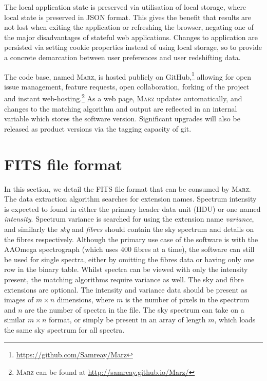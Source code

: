 \documentclass[5p]{elsarticle}
\newcommand{\marz}{\textsc{Marz}}
\begin{document}
The local application state is preserved via utilisation of local storage, where local state is preserved in JSON format. This gives the benefit that results are not lost when exiting the application or refreshing the browser, negating one of the major disadvantages of stateful web applications. Changes to application are persisted via setting cookie properties instead of using local storage, so to provide a concrete demarcation between user preferences and user redshifting data.



The code base, named \marz{}, is hosted publicly on GitHub,\footnote{\url{https://github.com/Samreay/Marz}} allowing for open issue management, feature requests, open collaboration, forking of the project and instant web-hosting.\footnote{\marz{} can be found at \url{http://samreay.github.io/Marz/}} As a web page, \marz{} updates automatically, and changes to the matching algorithm and output are reflected in an internal variable which stores the software version. Significant upgrades will also be released as product versions via the tagging capacity of git.












\section{FITS file format} \label{sec:format}

In this section, we detail the FITS file format that can be consumed by \marz{}. The data extraction algorithm searches for extension names. Spectrum intensity is expected to found in either the primary header data unit (HDU) or one named \textit{intensity}. Spectrum variance is searched for using the extension name \textit{variance}, and similarly the \textit{sky} and \textit{fibres} should contain the sky spectrum and details on the fibres respectively. Although the primary use case of the software is with the AAOmega spectrograph (which uses 400 fibres at a time), the software can still be used for single spectra, either by omitting the fibres data or having only one row in the binary table. Whilst spectra can be viewed with only the intensity present, the matching algorithms require variance as well. The sky and fibre extensions are optional. The intensity and variance data should be present as images of $m\times n$ dimensions, where $m$ is the number of pixels in the spectrum and $n$ are the number of spectra in the file. The sky spectrum can take on a similar $m\times n$ format, or simply be present in an array of length $m$, which loads the same sky spectrum for all spectra.
\end{document}
